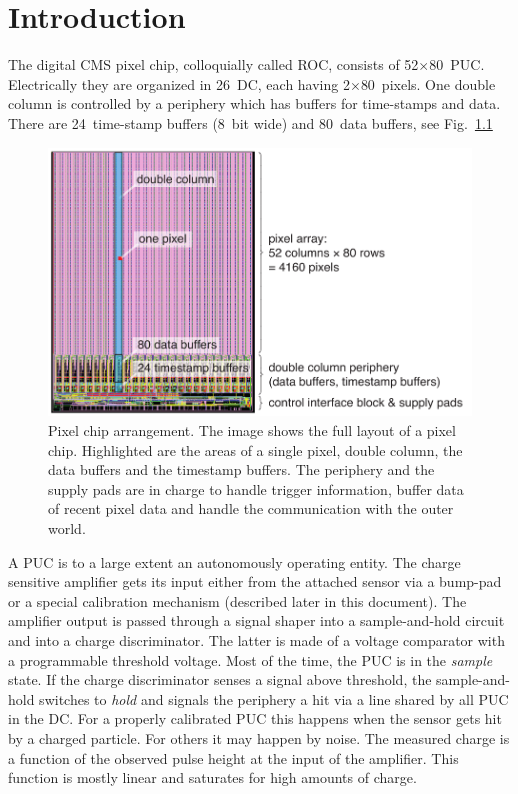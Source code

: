 \chapter{Introduction}

The digital CMS pixel chip, colloquially called \gls{ROC}, consists of 52$\times$80~\gls{PUC}. Electrically they are organized in 26~\gls{DC}, each having 2$\times$80~pixels. One double column is controlled by a periphery which has buffers for time-stamps and data. There are 24~time-stamp buffers (8~bit wide) and 80~data buffers, see Fig.~\ref{fig:ROCimage}

\begin{figure}[hbtp]
	\begin{center}
	\includegraphics[width=.9\textwidth]{img/ROCimage.pdf}
	\end{center}
	\caption{Pixel chip arrangement. The image shows the full layout of a pixel chip. Highlighted are the areas of a single pixel, double column, the data buffers and the timestamp buffers. The periphery and the supply pads are in charge to handle trigger information, buffer data of recent pixel data and handle the communication with the outer world.}
	\label{fig:ROCimage}
\end{figure}

A \gls{PUC} is to a large extent an autonomously operating entity. The charge sensitive amplifier gets its input either from the attached sensor via a bump-pad or a special calibration mechanism (described later in this document). The amplifier output is passed through a signal shaper into a sample-and-hold circuit and into a charge discriminator. The latter is made of a voltage comparator with a programmable threshold voltage. Most of the time, the \gls{PUC} is in the \emph{sample} state. If the charge discriminator senses a signal above threshold, the sample-and-hold switches to \emph{hold} and signals the periphery a hit via a line shared by all \gls{PUC} in the \gls{DC}. For a properly calibrated \gls{PUC} this happens when the sensor gets hit by a charged particle. For others it may happen by noise. The measured charge is a function of the observed pulse height at the input of the amplifier. This function is mostly linear and saturates for high amounts of charge.

